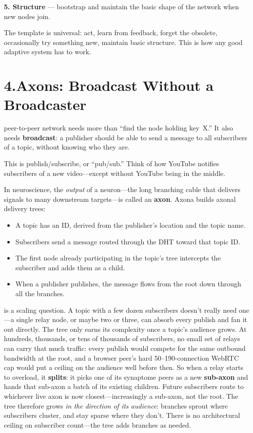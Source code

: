 \documentclass[nobib,justified]{tufte-handout}
\begin{document}
\textbf{5. Structure} --- bootstrap and maintain the basic shape of the network when new nodes join.

The template is universal: act, learn from feedback, forget the obsolete, occasionally try something new, maintain basic structure. This is how any good adaptive system has to work.

\section{4.\quad Axons: Broadcast Without a Broadcaster}

 peer-to-peer network needs more than ``find the node holding key~X.'' It also needs \textbf{broadcast}: a publisher should be able to send a message to all subscribers of a topic, without knowing who they are.

This is publish/subscribe, or ``pub/sub.'' Think of how YouTube notifies subscribers of a new video---except without YouTube being in the middle.

In neuroscience, the \emph{output} of a neuron---the long branching cable that delivers signals to many downstream targets---is called an \textbf{axon}. Axona builds axonal delivery trees:

\begin{itemize}
  \item A topic has an ID, derived from the publisher's location and the topic name.
  \item Subscribers send a message routed through the DHT toward that topic ID.
  \item The first node already participating in the topic's tree intercepts the subscriber and adds them as a child.
  \item When a publisher publishes, the message flows from the root down through all the branches.
\end{itemize}

 is a scaling question. A topic with a few dozen subscribers doesn't really need one---a single relay node, or maybe two or three, can absorb every publish and fan it out directly. The tree only earns its complexity once a topic's audience grows. At hundreds, thousands, or tens of thousands of subscribers, no small set of relays can carry that much traffic: every publish would compete for the same outbound bandwidth at the root, and a browser peer's hard 50--190-connection WebRTC cap would put a ceiling on the audience well before then. So when a relay starts to overload, it \textbf{splits}: it picks one of its synaptome peers as a new \textbf{sub-axon} and hands that sub-axon a batch of its existing children. Future subscribers route to whichever live axon is now closest---increasingly a sub-axon, not the root. The tree therefore grows \emph{in the direction of its audience}: branches sprout where subscribers cluster, and stay sparse where they don't. There is no architectural ceiling on subscriber count---the tree adds branches as needed.
\end{document}

